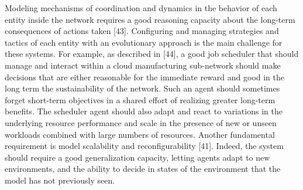 Modeling mechanisms of coordination and dynamics in the behavior of each entity inside the network requires a good reasoning capacity about the long-term consequences of actions taken [43]. Configuring and managing strategies and tactics of each entity with an evolutionary approach is the main challenge for these systems. For example, as described in [44], a good job scheduler that should manage and interact within a cloud manufacturing sub-network should make decisions that are either reasonable for the immediate reward and good in the long term the sustainability of the network. Such an agent should sometimes forget short-term objectives in a shared effort of realizing greater long-term benefits. The scheduler agent should also adapt and react to variations in the underlying resource performance and scale in the presence of new or unseen workloads combined with large numbers of resources. Another fundamental requirement is model scalability and reconfigurability [41]. Indeed, the system should require a good generalization capacity, letting agents adapt to new environments, and the ability to decide in states of the environment that the model has not previously seen.
